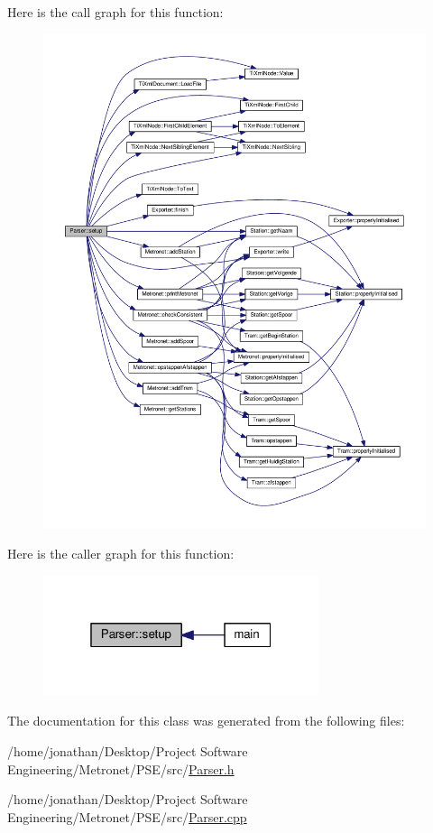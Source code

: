 Here is the call graph for this function\+:
\nopagebreak
\begin{figure}[H]
\begin{center}
\leavevmode
\includegraphics[width=350pt]{class_parser_a568d2353b3e6f89b0cf112f309229ffe_cgraph}
\end{center}
\end{figure}




Here is the caller graph for this function\+:
\nopagebreak
\begin{figure}[H]
\begin{center}
\leavevmode
\includegraphics[width=229pt]{class_parser_a568d2353b3e6f89b0cf112f309229ffe_icgraph}
\end{center}
\end{figure}




The documentation for this class was generated from the following files\+:\begin{DoxyCompactItemize}
\item 
/home/jonathan/\+Desktop/\+Project Software Engineering/\+Metronet/\+P\+S\+E/src/\hyperlink{_parser_8h}{Parser.\+h}\item 
/home/jonathan/\+Desktop/\+Project Software Engineering/\+Metronet/\+P\+S\+E/src/\hyperlink{_parser_8cpp}{Parser.\+cpp}\end{DoxyCompactItemize}
